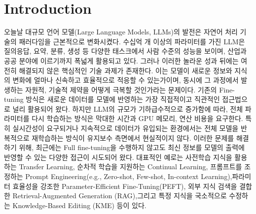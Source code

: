 \documentclass[a4paper,fleqn]{cas-sc}
\begin{document}
\section{Introduction}

오늘날 대규모 언어 모델(Large Language Models, LLMs)의 발전은 자연어 처리 기술의 패러다임을 근본적으로 변화시켰다. 
수십억 개 이상의 파라미터를 가진 LLM은 질의응답, 요약, 분류, 생성 등 다양한 태스크에서 사람 수준의 성능을 보이며, 산업과 공공 분야에 이르기까지 폭넓게 활용되고 있다. 
그러나 이러한 놀라운 성과 뒤에는 여전히 해결되지 않은 핵심적인 기술 과제가 존재한다. 
이는 모델이 새로운 정보와 지식의 변화에 얼마나 신속하고 효율적으로 적응할 수 있는가이며, 동시에 그 과정에서 발생하는 자원적, 기술적 제약을 어떻게 극복할 것인가라는 문제이다.
기존의 Fine-tuning 방식은 새로운 데이터를 모델에 반영하는 가장 직접적이고 직관적인 접근법으로 널리 활용되어 왔다. 
하지만 LLM의 규모가 기하급수적으로 증가함에 따라, 전체 파라미터를 다시 학습하는 방식은 막대한 시간과 GPU 메모리, 연산 비용을 요구한다. 
특히 실시간성이 요구되거나 지속적으로 데이터가 유입되는 환경에서는 전체 모델을 반복적으로 재학습하는 방식이 유지보수 측면에서 현실적이지 않다. 
이러한 문제를 해결하기 위해, 최근에는 Full fine-tuning을 수행하지 않고도 최신 정보를 모델의 출력에 반영할 수 있는 다양한 접근이 시도되어 왔다. 
대표적인 예로는 사전학습 지식을 활용하는 Transfer Learning, 순차적 학습을 지원하는 Continual Learning, 프롬프트를 조정하는 Prompt Engineering(e.g., Zero-shot, Few-shot, In-context Learning),파라미터 효율성을 강조한 Parameter-Efficient Fine-Tuning(PEFT), 외부 지식 검색을 결합한 Retrieval-Augmented Generation (RAG),그리고 특정 지식을 국소적으로 수정하는 Knowledge-Based Editing (KME) 등이 있다.
\end{document}
